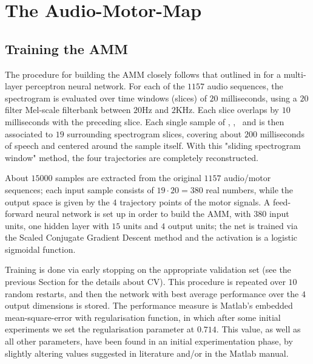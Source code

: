 \section{The Audio-Motor-Map}
\label{sec:rec}

\subsection{Training the AMM}
\label{subsec:amm_setup}

The procedure for building the AMM closely follows that outlined in
\cite{papcun,richmond2002,richmond2007} for a multi-layer perceptron neural network.
For each of the $1157$ audio sequences, the spectrogram is evaluated
over time windows (slices) of $20$ milliseconds, using a $20$ filter
Mel-scale filterbank between $20$Hz and $2$KHz. Each slice overlaps by $10$ milliseconds with
the preceding slice. Each single sample of \vlio, \alio, \vttu\ and \attu is
then associated to $19$ surrounding spectrogram slices, covering
about $200$ milliseconds of speech and centered around the sample itself. With this
"sliding spectrogram window" method, the four trajectories are completely reconstructed.

About $15000$ samples are extracted from the original $1157$
audio/motor sequences; each input sample consists of $19\cdot 20 = 380$ real
numbers, while the output space is given by the $4$ trajectory points of
the motor signals. A feed-forward neural network is set up in order to
build the AMM, with $380$ input units, one hidden layer with $15$ units and
$4$ output units; the net is trained via the Scaled Conjugate Gradient
Descent method \cite{MOLLER93} and the activation is a logistic sigmoidal function.

Training is done via early stopping on the appropriate validation set (see the previous
Section for the details about CV). This procedure is repeated over $10$ random restarts, and then
the network with best average performance over the $4$ output dimensions is stored.
The performance measure is Matlab's embedded mean-square-error with regularisation
function, in which after some initial experiments we set the regularisation
parameter at $0.714$. This value, as well as all other parameters, have been found in
an initial experimentation phase, by slightly altering values suggested in literature
and/or in the Matlab manual.

